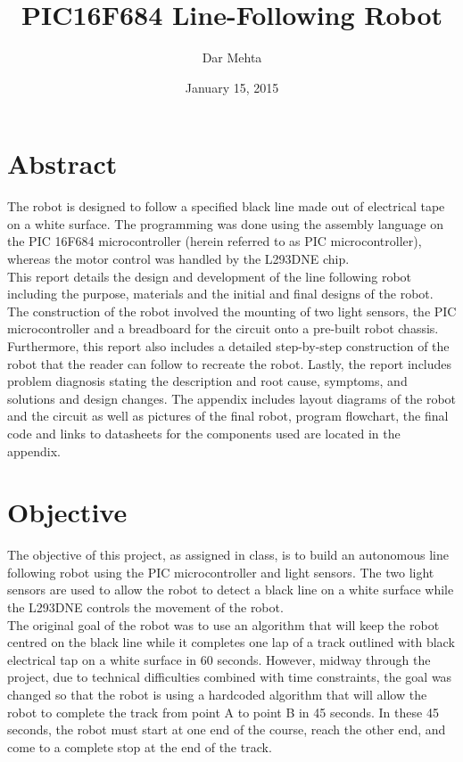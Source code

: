 \documentclass[12pt]{article}
\title{PIC16F684 Line-Following Robot}
\author{Dar Mehta}
\date{January 15, 2015}
\begin{document}
\maketitle
\newpage
\tableofcontents
\newpage

\section{Abstract}	
The robot is designed to follow a specified black line made out of electrical tape on a white surface. The programming was done using the assembly language on the PIC 16F684 microcontroller (herein referred to as PIC microcontroller), whereas the motor control was handled by the L293DNE chip.
\\[\baselineskip]
This report details the design and development of the line following robot including the purpose, materials and the initial and final designs of the robot. The construction of the robot involved the mounting of two light sensors, the PIC microcontroller and a breadboard for the circuit onto a pre-built robot chassis. Furthermore, this report also includes a detailed step-by-step construction of the robot that the reader can follow to recreate the robot. Lastly, the report includes problem diagnosis stating the description and root cause, symptoms, and solutions and design changes. The appendix includes layout diagrams of the robot and the circuit as well as pictures of the final robot, program flowchart, the final code and links to datasheets for the components used are located in the appendix.

\section{Objective}
The objective of this project, as assigned in class, is to build an autonomous line following robot using the PIC microcontroller and light sensors. The two light sensors are used to allow the robot to detect a black line on a white surface while the L293DNE controls the movement of the robot.
\\[\baselineskip]
The original goal of the robot was to use an algorithm that will keep the robot centred on the black line while it completes one lap of a track outlined with black electrical tap on a white surface in 60 seconds. However, midway through the project, due to technical difficulties combined with time constraints, the goal was changed so that the robot is using a hardcoded algorithm that will allow the robot to complete the track from point A to point B in 45 seconds. In these 45 seconds, the robot must start at one end of the course, reach the other end, and come to a complete stop at the end of the track.
\end{document}
